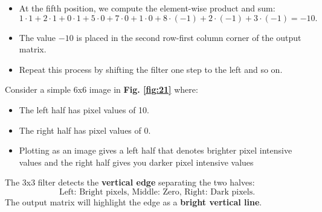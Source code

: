 \documentclass[letterpaper,12pt,notitlepage,twoside]{report}
\begin{document}

\begin{itemize}[nosep]
    \item At the fifth position, we compute the element-wise product and sum:
    \[
    1 \cdot 1 + 2 \cdot 1 + 0 \cdot 1 + 5 \cdot 0 + 7 \cdot 0 + 1 \cdot 0 + 8 \cdot (-1) + 2 \cdot (-1) + 3 \cdot (-1) = -10.
    \]
    \item The value \(-10\) is placed in the second row-first column corner of the output matrix.
    \item Repeat this process by shifting the filter one step to the left and so on.
\end{itemize}

Consider a simple 6x6 image in  \textbf{Fig. \ref{fig:21}} where:
    \begin{itemize}[nosep]
        \item The left half has pixel values of 10.
        \item The right half has pixel values of 0.
        \item Plotting as an image gives a left half that denotes brighter pixel intensive values and the right half gives you darker pixel intensive values
    \end{itemize}
The 3x3 filter detects the \textbf{vertical edge} separating the two halves:
    \[
    \text{Left: Bright pixels, Middle: Zero, Right: Dark pixels}.
    \]
The output matrix will highlight the edge as a \textbf{bright vertical line}.
\end{document}
